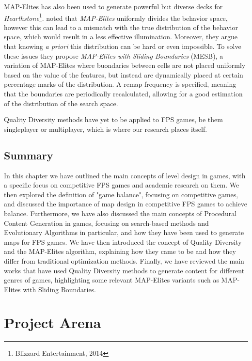 \documentclass{Configuration_Files/PoliMi3i_thesis}
\begin{document}
MAP-Elites has also been used to generate powerful but diverse decks for \textit{Hearthstone}\footnote{Blizzard Entertainment, 2014}. \citeauthor{fontaine_mapping_2019} noted that \textit{MAP-Elites} uniformly divides the behavior space, however this can lead to a mismatch with the true distribution of the behavior space, which would result in a less effective illumination. Moreover, they argue that knowing \textit{a priori} this distribution can be hard or even impossible. To solve these issues they propose \textit{MAP-Elites with Sliding Boundaries} (MESB), a variation of MAP-Elites where buondaries between cells are not placed uniformly based on the value of the features, but instead are dynamically placed at certain percentage marks of the distribution. A remap frequency is specified, meaning that the boundaries are periodically recalculated, allowing for a good estimation of the distribution of the search space. \cite{fontaine_mapping_2019}

Quality Diversity methods have yet to be applied to FPS games, be them singleplayer or multiplayer, which is where our research places itself.

\section{Summary}
\label{sec:ch1_summary}
In this chapter we have outlined the main concepts of level design in games, with a specific focus on competitive FPS games and academic research on them. We then explored the definition of "game balance", focusing on competitive games, and discussed the importance of map design in competitive FPS games to achieve balance. Furthermore, we have also discussed the main concepts of Procedural Content Generation in games, focusing on search-based methods and Evolutionary Algorithms in particular, and how they have been used to generate maps for FPS games. We have then introduced the concept of Quality Diversity and the MAP-Elites algorithm, explaining how they came to be and how they differ from traditional optimization methods. Finally, we have reviewed the main works that have used Quality Diversity methods to generate content for different genres of games, highlighting some relevant MAP-Elites variants such as MAP-Elites with Sliding Boundaries.


\chapter{Project Arena}
\label{ch:project_arena}
\end{document}

